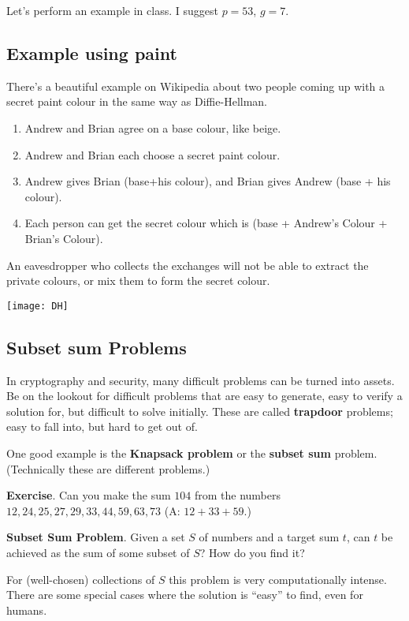 \documentclass[11pt]{article}
\theoremstyle{definition}
\numberwithin{thm}{section}
\begin{document}
Let's perform an example in class. I suggest $p=53$, $g = 7$.

\subsection{Example using paint}

There's a beautiful example on Wikipedia about two people coming up with a secret paint colour in the same way as Diffie-Hellman.

\begin{enumerate}
	\item Andrew and Brian agree on a base colour, like beige.
    \item Andrew and Brian each choose a secret paint colour.
    \item Andrew gives Brian (base+his colour), and Brian gives Andrew (base + his colour).
    \item Each person can get the secret colour which is (base + Andrew's Colour + Brian's Colour).
\end{enumerate}

An eavesdropper who collects the exchanges will not be able to extract the private colours, or mix them to form the secret colour.
\begin{center}
\texttt{[image: DH]}
\end{center}

\subsection{Subset sum Problems}

In cryptography and security, many difficult problems can be turned into assets. Be on the lookout for difficult problems that are easy to generate, easy to verify a solution for, but difficult to solve initially.  These are called \textbf{trapdoor} problems; easy to fall into, but hard to get out of.

One good example is the \textbf{Knapsack problem} or the \textbf{subset sum} problem. (Technically these are different problems.)

\textbf{Exercise}. Can you make the sum $104$ from the numbers $12, 24, 25, 27, 29, 33, 44, 59, 63, 73$ (A: $12 + 33 + 59$.)

\textbf{Subset Sum Problem}. Given a set $S$ of numbers and a target sum $t$, can $t$ be achieved as the sum of some subset of $S$? How do you find it? 

For (well-chosen) collections of $S$ this problem is very computationally intense. There are some special cases where the solution is ``easy'' to find, even for humans.
\end{document}
